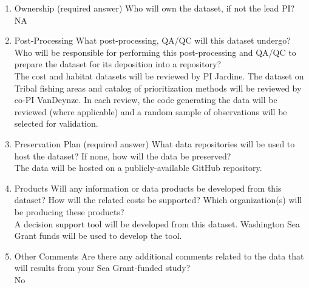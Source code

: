 \documentclass[12pt]{elsarticle}
\begin{document}
\begin{enumerate}
\item		Ownership (required answer)
Who will own the dataset, if not the lead PI?\\
NA\\

\item		Post-Processing
What post-processing, QA/QC will this dataset undergo? Who will be responsible for performing this post-processing and QA/QC to prepare the dataset for its deposition into a repository?\\
The cost and habitat datasets will be reviewed by PI Jardine. The dataset on Tribal fishing areas and catalog of prioritization methods will be reviewed by co-PI VanDeynze. In each review, the code generating the data will be reviewed (where applicable) and a random sample of observations will be selected for validation.\\

\item		Preservation Plan (required answer) 
What data repositories will be used to host the dataset? If none, how will the data be preserved?\\
The data will be hosted on a publicly-available GitHub repository.\\
 
\item		Products
 Will any information or data products be developed from this dataset? How will the related costs be supported? Which organization(s) will be producing these products?\\
 A decision support tool will be developed from this dataset. Washington Sea Grant funds will be used to develop the tool. \\

\item		Other Comments
Are there any additional comments related to the data that will results from your Sea Grant-funded study?\\
No\\


\end{enumerate}
\end{document}
